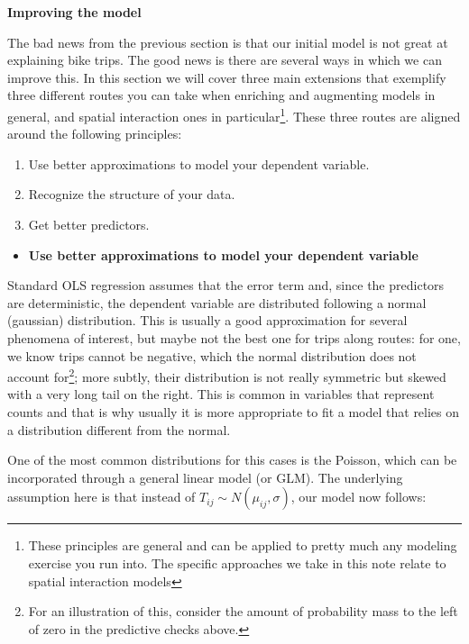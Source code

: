 \documentclass[
  letterpaper,
  DIV=11,
  numbers=noendperiod,
  oneside]{scrreprt}
\providecommand{\tightlist}{%
  \setlength{\itemsep}{0pt}\setlength{\parskip}{0pt}}\usepackage{longtable,booktabs,array}
\begin{document}
\textbf{Improving the model}

The bad news from the previous section is that our initial model is not
great at explaining bike trips. The good news is there are several ways
in which we can improve this. In this section we will cover three main
extensions that exemplify three different routes you can take when
enriching and augmenting models in general, and spatial interaction ones
in particular\footnote{These principles are general and can be applied
  to pretty much any modeling exercise you run into. The specific
  approaches we take in this note relate to spatial interaction models}.
These three routes are aligned around the following principles:

\begin{enumerate}
\def\labelenumi{\arabic{enumi}.}
\tightlist
\item
  Use better approximations to model your dependent variable.
\item
  Recognize the structure of your data.
\item
  Get better predictors.
\end{enumerate}

\begin{itemize}
\tightlist
\item
  \textbf{Use better approximations to model your dependent variable}
\end{itemize}

Standard OLS regression assumes that the error term and, since the
predictors are deterministic, the dependent variable are distributed
following a normal (gaussian) distribution. This is usually a good
approximation for several phenomena of interest, but maybe not the best
one for trips along routes: for one, we know trips cannot be negative,
which the normal distribution does not account for\footnote{For an
  illustration of this, consider the amount of probability mass to the
  left of zero in the predictive checks above.}; more subtly, their
distribution is not really symmetric but skewed with a very long tail on
the right. This is common in variables that represent counts and that is
why usually it is more appropriate to fit a model that relies on a
distribution different from the normal.

One of the most common distributions for this cases is the Poisson,
which can be incorporated through a general linear model (or GLM). The
underlying assumption here is that instead of
\(T_{ij} \sim N(\mu_{ij}, \sigma)\), our model now follows:
\end{document}
